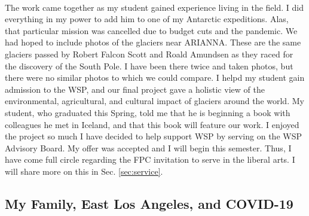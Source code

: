 \documentclass[../../main.tex]{subfiles}
\begin{document}
\\
\vspace{0.25cm}
The work came together as my student gained experience living in the field.  I did everything in my power to add him to one of my Antarctic expeditions.  Alas, that particular mission was cancelled due to budget cuts and the pandemic.  We had hoped to include photos of the glaciers near ARIANNA.  These are the same glaciers passed by Robert Falcon Scott and Roald Amundsen as they raced for the discovery of the South Pole.  I have been there twice and taken photos, but there were no similar photos to which we could compare.  I helpd my student gain admission to the WSP, and our final project gave a holistic view of the environmental, agricultural, and cultural impact of glaciers around the world.  My student, who graduated this Spring, told me that he is beginning a book with colleagues he met in Iceland, and that this book will feature our work.  I enjoyed the project so much I have decided to help support WSP by serving on the WSP Advisory Board.  My offer was accepted and I will begin this semester.  Thus, I have come full circle regarding the FPC invitation to serve in the liberal arts.  I will share more on this in Sec. \ref{sec:service}.

\subsection{My Family, East Los Angeles, and COVID-19}
\label{sec:family}
\end{document}
